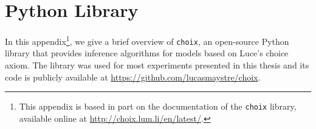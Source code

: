 \chapter{Python Library}

In this appendix\footnote{%
This appendix is based in part on the documentation of the \texttt{choix} library, available online at \url{http://choix.lum.li/en/latest/}.},
we give a brief overview of \texttt{choix}, an open-source Python library that provides inference algorithms for models based on Luce's choice axiom.
The library was used for most experiments presented in this thesis and its code is publicly available at \url{https://github.com/lucasmaystre/choix}.




